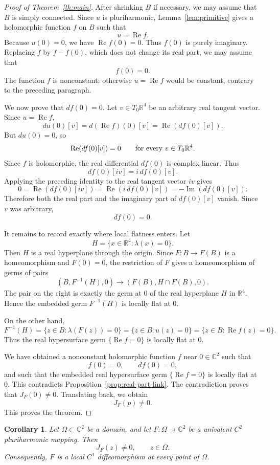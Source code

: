 \documentclass[11pt]{amsart}
\newtheorem{corollary}[theorem]{Corollary}
\theoremstyle{definition}
\theoremstyle{remark}
\newcommand{\C}{\mathbb C}
\newcommand{\R}{\mathbb R}
\newcommand{\re}{\operatorname{Re}}
\newcommand{\im}{\operatorname{Im}}
\begin{document}
\begin{proof}[Proof of Theorem~\ref{th:main}]
After shrinking $B$ if necessary, we may assume that $B$ is simply
connected. Since $u$ is pluriharmonic, Lemma~\ref{lem:primitive} gives
a holomorphic function $f$ on $B$ such that
\[
        u=\re f.
\]
Because $u(0)=0$, we have $\re f(0)=0$. Thus $f(0)$ is purely
imaginary. Replacing $f$ by $f-f(0)$, which does not change its real
part, we may assume that
\[
        f(0)=0.
\]
The function $f$ is nonconstant; otherwise $u=\re f$ would be constant,
contrary to the preceding paragraph.

We now prove that $df(0)=0$. Let $v\in T_0\R^4$ be an arbitrary real
tangent vector. Since $u=\re f$,
\[
        du(0)[v]=d(\re f)(0)[v]=\re(df(0)[v]).
\]
But $du(0)=0$, so
\[
        \re(df(0)[v])=0
        \qquad
        \hbox{for every }v\in T_0\R^4.
\]
Since $f$ is holomorphic, the real differential $df(0)$ is complex
linear. Thus
\[
        df(0)[iv]=i\,df(0)[v].
\]
Applying the preceding identity to the real tangent vector $iv$ gives
\[
        0
        =\re(df(0)[iv])
        =\re(i\,df(0)[v])
        =-\im(df(0)[v]).
\]
Therefore both the real part and the imaginary part of $df(0)[v]$
vanish. Since $v$ was arbitrary,
\[
        df(0)=0.
\]

It remains to record exactly where local flatness enters. Let
\[
        H=\{x\in\R^4:\lambda(x)=0\}.
\]
Then $H$ is a real hyperplane through the origin. Since $F:B\to F(B)$
is a homeomorphism and $F(0)=0$, the restriction of $F$ gives a
homeomorphism of germs of pairs
\[
        (B,F^{-1}(H),0)
        \longrightarrow
        (F(B),H\cap F(B),0).
\]
The pair on the right is exactly the germ at $0$ of the real hyperplane
$H$ in $\R^4$. Hence the embedded germ $F^{-1}(H)$ is locally flat at
$0$.

On the other hand,
\[
        F^{-1}(H)
        =\{z\in B:\lambda(F(z))=0\}
        =\{z\in B:u(z)=0\}
        =\{z\in B:\re f(z)=0\}.
\]
Thus the real hypersurface germ $\{\re f=0\}$ is locally flat at
$0$.

We have obtained a nonconstant holomorphic function $f$ near
$0\in\C^2$ such that
\[
        f(0)=0,
        \qquad
        df(0)=0,
\]
and such that the embedded real hypersurface germ $\{\re f=0\}$ is
locally flat at $0$. This contradicts Proposition~\ref{prop:real-part-link}.
The contradiction proves that $J_F(0)\ne0$. Translating back, we obtain
\[
        J_F(p)\ne0.
\]
This proves the theorem.
\end{proof}


\begin{corollary}\label{cor:univalent}
Let $\Omega\subset\C^2$ be a domain, and let $F:\Omega\to\C^2$ be a
univalent $C^2$ pluriharmonic mapping. Then
\[
        J_F(z)\ne0,
        \qquad z\in\Omega.
\]
Consequently, $F$ is a local $C^1$ diffeomorphism at every point of
$\Omega$.
\end{corollary}
\end{document}
